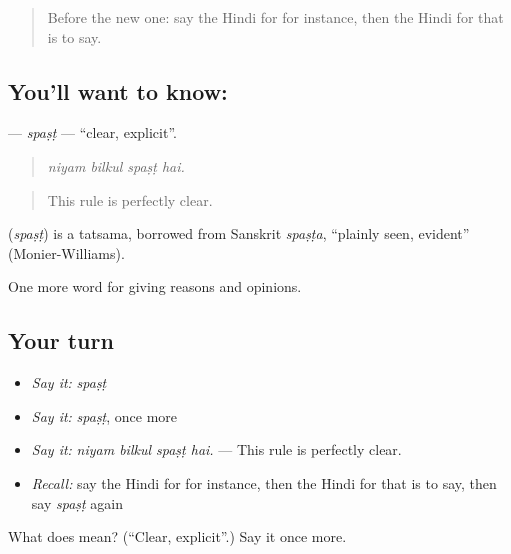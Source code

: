 \begin{quote}
Before the new one: say the Hindi for for instance, then the Hindi for that is to say.
\end{quote}

\subsection*{You'll want to know: }
\textbf{} — \emph{spaṣṭ} — \textquotedblleft{}clear, explicit\textquotedblright{}.

\begin{quote}
   
\end{quote}

\begin{quote}
\emph{niyam bilkul spaṣṭ hai.}
\end{quote}

\begin{quote}
This rule is perfectly clear.
\end{quote}

\begin{cousinweb}
\textbf{} (\emph{spaṣṭ}) is a tatsama, borrowed from Sanskrit \emph{spaṣṭa}, \textquotedblleft{}plainly seen, evident\textquotedblright{} (Monier-Williams).
\end{cousinweb}

\begin{grammarlens}[title={What you've built}]
One more word for giving reasons and opinions.
\end{grammarlens}

\subsection*{Your turn}
\begin{itemize}
\raggedright
  \item \emph{Say it:} \emph{spaṣṭ}
  \item \emph{Say it:} \emph{spaṣṭ}, once more
  \item \emph{Say it:} \emph{niyam bilkul spaṣṭ hai.} — This rule is perfectly clear.
  \item \emph{Recall:} say the Hindi for for instance, then the Hindi for that is to say, then say \emph{spaṣṭ} again
\end{itemize}

\begin{tcolorbox}[breakable,colback=teal!4,colframe=teal!35!black,title={Before you move on}]
What does  mean? (\textquotedblleft{}Clear, explicit\textquotedblright{}.) Say it once more.
\end{tcolorbox}
